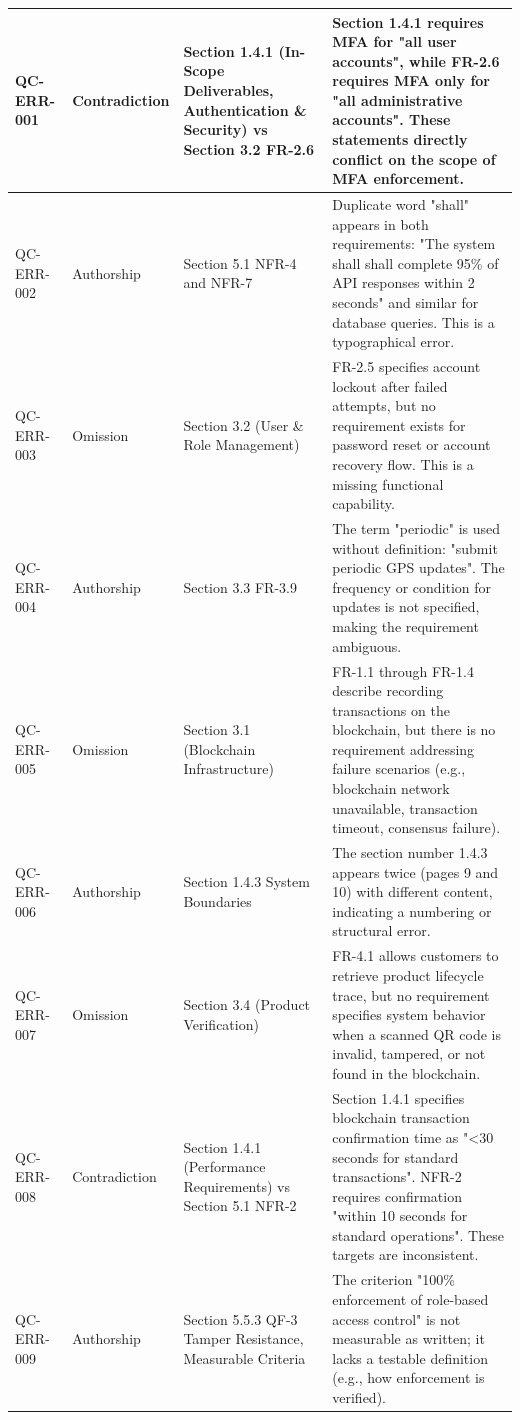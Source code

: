 \documentclass[11pt,a4paper]{article}
\begin{document}
\begin{longtable}{|>{\RaggedRight\arraybackslash}p{}|>{\RaggedRight\arraybackslash}p{}|>{\RaggedRight\arraybackslash}p{}|>{\RaggedRight\arraybackslash}p{}|}
QC-ERR-001 & Contradiction & Section 1.4.1 (In-Scope Deliverables, Authentication \& Security) vs Section 3.2 FR-2.6 & Section 1.4.1 requires MFA for "all user accounts", while FR-2.6 requires MFA only for "all administrative accounts". These statements directly conflict on the scope of MFA enforcement. \\
\hline
QC-ERR-002 & Authorship & Section 5.1 NFR-4 and NFR-7 & Duplicate word "shall" appears in both requirements: "The system shall shall complete 95\% of API responses within 2 seconds" and similar for database queries. This is a typographical error. \\
\hline
QC-ERR-003 & Omission & Section 3.2 (User \& Role Management) & FR-2.5 specifies account lockout after failed attempts, but no requirement exists for password reset or account recovery flow. This is a missing functional capability. \\
\hline
QC-ERR-004 & Authorship & Section 3.3 FR-3.9 & The term "periodic" is used without definition: "submit periodic GPS updates". The frequency or condition for updates is not specified, making the requirement ambiguous. \\
\hline
QC-ERR-005 & Omission & Section 3.1 (Blockchain Infrastructure) & FR-1.1 through FR-1.4 describe recording transactions on the blockchain, but there is no requirement addressing failure scenarios (e.g., blockchain network unavailable, transaction timeout, consensus failure). \\
\hline
QC-ERR-006 & Authorship & Section 1.4.3 System Boundaries & The section number 1.4.3 appears twice (pages 9 and 10) with different content, indicating a numbering or structural error. \\
\hline
QC-ERR-007 & Omission & Section 3.4 (Product Verification) & FR-4.1 allows customers to retrieve product lifecycle trace, but no requirement specifies system behavior when a scanned QR code is invalid, tampered, or not found in the blockchain. \\
\hline
QC-ERR-008 & Contradiction & Section 1.4.1 (Performance Requirements) vs Section 5.1 NFR-2 & Section 1.4.1 specifies blockchain transaction confirmation time as "<30 seconds for standard transactions". NFR-2 requires confirmation "within 10 seconds for standard operations". These targets are inconsistent. \\
\hline
QC-ERR-009 & Authorship & Section 5.5.3 QF-3 Tamper Resistance, Measurable Criteria & The criterion "100\% enforcement of role-based access control" is not measurable as written; it lacks a testable definition (e.g., how enforcement is verified). \\

\end{longtable}
\end{document}
